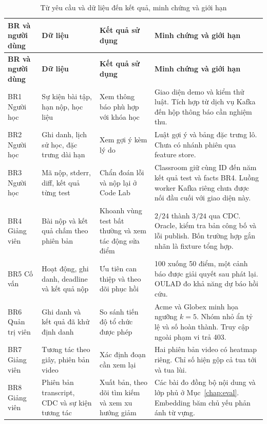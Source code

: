 {\small
\begin{longtable}{@{}L{2.25cm}L{3.1cm}L{4.3cm}L{4.85cm}@{}}
\caption{Từ yêu cầu và dữ liệu đến kết quả, minh chứng và giới hạn}\label{tab:scenarios}\\
\toprule
\textbf{BR và người dùng} & \textbf{Dữ liệu} & \textbf{Kết quả sử dụng} & \textbf{Minh chứng và giới hạn} \\
\midrule
\endfirsthead
\toprule
\textbf{BR và người dùng} & \textbf{Dữ liệu} & \textbf{Kết quả sử dụng} & \textbf{Minh chứng và giới hạn} \\
\midrule
\endhead
BR1 Người học & Sự kiện bài tập, hạn nộp, học liệu & Xem thông báo phù hợp với khóa học & Giao diện demo và kiểm thử luật. Tích hợp từ dịch vụ Kafka đến hộp thông báo cần nghiệm thu. \\
BR2 Người học & Ghi danh, lịch sử học, đặc trưng dài hạn & Xem gợi ý kèm lý do & Luật gợi ý và bảng đặc trưng lô. Chưa có nhánh phiên qua feature store. \\
BR3 Người học & Mã nộp, stderr, diff, kết quả từng test & Chẩn đoán lỗi và nộp lại ở Code Lab & Classroom giữ cùng ID đến năm kết quả test và facts BR4. Luồng worker Kafka riêng chưa được nối đầu cuối với giao diện này. \\
BR4 Giảng viên & Bài nộp và kết quả chấm theo phiên bản & Khoanh vùng test bất thường và xem tác động sửa điểm & $2/24$ thành $3/24$ qua CDC. Oracle, kiểm tra bản công bố và lỗi publish. Bốn trường hợp gắn nhãn là fixture tổng hợp. \\
BR5 Cố vấn & Hoạt động, ghi danh, deadline và kết quả nộp & Ưu tiên can thiệp và theo dõi phục hồi & 100 xuống 50 điểm, một cảnh báo được giải quyết sau phát lại. OULAD đo khả năng dự báo hồi cứu. \\
BR6 Quản trị viên & Ghi danh và kết quả đã khử định danh & So sánh tiến độ tổ chức được phép & Acme và Globex minh họa ngưỡng $k=5$. Nhóm nhỏ ẩn tỷ lệ và số hoàn thành. Truy cập ngoài phạm vi trả 403. \\
BR7 Giảng viên & Tương tác theo giây, phiên bản video & Xác định đoạn cần xem lại & Hai phiên bản video có heatmap riêng. Chỉ số  hiện gộp cả tua tới và tua lùi. \\
BR8 Giảng viên & Phiên bản transcript, CDC và sự kiện tương tác & Xuất bản, theo dõi tìm kiếm và xem xu hướng giảm & Các bài đo đồng bộ nội dung và lớp phủ ở Mục~\ref{chap:eval}. Embedding băm chủ yếu phản ánh từ vựng. \\
\bottomrule
\end{longtable}}

